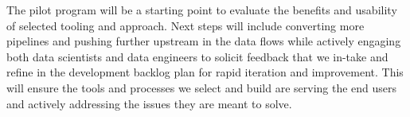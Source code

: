 \documentclass{article}
\begin{document}
The pilot program will be a starting point to evaluate the benefits and usability of selected tooling and approach. Next steps will include converting more pipelines and pushing further upstream in the data flows while actively engaging both data scientists and data engineers to solicit feedback that we in-take and refine in the development backlog plan for rapid iteration and improvement. This will ensure the tools and processes we select and build are serving the end users and actively addressing the issues they are meant to solve.

\end{document}
